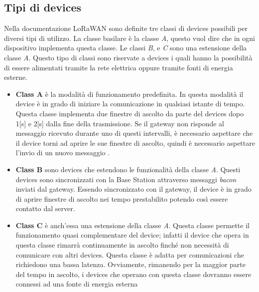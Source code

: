 \subsection{Tipi di devices}
Nella documentazione LoRaWAN sono definite tre classi di devices possibili per
diversi tipi di utilizzo. La classe basilare è la classe \emph{A}, questo vuol
dire che in ogni dispositivo implementa questa classe. Le classi \emph{B}, e
\emph{C} sono una estensione della classe \emph{A}. Questo tipo di classi sono
riservate a devices i quali hanno la possibilità di essere alimentati tramite la
rete elettrica oppure tramite fonti di energia esterne.
\begin{itemize}
        \item   \textbf{Class A} è la modalità di funzionamento predefinita. 
                In questa
                modalità il device è in grado di iniziare la comunicazione in qualsiasi istante
                di tempo. Questa classe implementa due finestre di ascolto da parte del devices
                dopo 1[s] e 2[s] dalla fine della trasmissione. Se il gateway non risponde al
                messaggio ricevuto durante uno di questi intervalli, è necessario aspettare che
                il device torni ad aprire le sue finestre di ascolto, quindi è necessario
                aspettare l'invio di un nuovo messaggio .
        \item   \textbf{Class B} sono devices che estendono le funzionalità della classe
                \emph{A}. Questi devices sono sincronizzati con la Base Station attraverso
                messaggi \emph{bacon} inviati dal gateway. Essendo sincronizzato con il gateway,
                il device è in grado di aprire finestre di ascolto nei tempo prestabilito
                potendo così essere contatto dal server.
        \item   \textbf{Class C} è anch'essa una estensione della classe \emph{A}. 
                Questa classe permette il funzionamento quasi complementare del device; infatti
                il device che opera in questa classe rimarrà continuamente in ascolto finché non
                necessità di comunicare con altri devices. Questa classe è adatta per
                comunicazioni che richiedono una bassa latenza. Ovviamente, rimanendo per la
                maggior parte del tempo in ascolto, i devices che operano con questa classe
                dovranno essere connessi ad una fonte di energia esterna 
\end{itemize}


